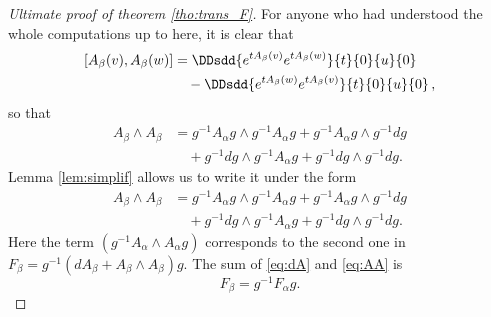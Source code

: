 \begin{proof}[Ultimate proof of theorem \ref{tho:trans_F}]
For anyone who had understood the whole computations up to here, it is clear that
\begin{equation}
\begin{split}
     [A_{\beta}(v),A_{\beta}(w)]&=\DDsdd{ e^{tA_{\beta}(v)}e^{tA_{\beta}(w)} }{t}{0}{u}{0}\\
                            &\quad-\DDsdd{ e^{tA_{\beta}(w)}e^{tA_{\beta}(v)} }{t}{0}{u}{0}\,,
\end{split}
\end{equation}
so that
\begin{equation}
\begin{split}
  A_{\beta}\wedge A_{\beta}&=g^{-1} A_{\alpha} g\wedge g^{-1} A_{\alpha} g
                         +g^{-1} A_{\alpha} g\wedge g^{-1} dg\\
		       &\quad+g^{-1} dg\wedge g^{-1} A_{\alpha} g
		       +g^{-1} dg\wedge g^{-1} dg.
\end{split}
\end{equation}
Lemma \ref{lem:simplif} allows us to write it under the form
\begin{equation}\label{eq:AA}
\begin{split}
  A_{\beta}\wedge A_{\beta}&=g^{-1} A_{\alpha} g\wedge g^{-1} A_{\alpha} g
                         +g^{-1} A_{\alpha} g\wedge g^{-1} dg\\
		       &\quad+g^{-1} dg\wedge g^{-1} A_{\alpha} g
		       +g^{-1} dg\wedge g^{-1} dg.
\end{split}
\end{equation}
Here the term $(g^{-1} A_{\alpha}\wedge A_{\alpha} g)$ corresponds to the second one in $F_{\beta}=g^{-1}(dA_{\beta}+A_{\beta}\wedge A_{\beta})g$. The sum of \eqref{eq:dA} and \eqref{eq:AA} is
\[
    F_{\beta}=g^{-1} F_{\alpha} g.
\]
\end{proof}
